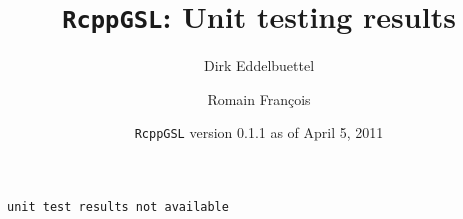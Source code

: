 \documentclass[10pt]{article}
\author{Dirk Eddelbuettel \and Romain Fran\c{c}ois}
\title{\texttt{RcppGSL}: Unit testing results}
\date{\texttt{RcppGSL} version 0.1.1 as of April  5, 2011}
\begin{document}
\maketitle

\begin{verbatim}
unit test results not available\end{verbatim}
\end{document}
